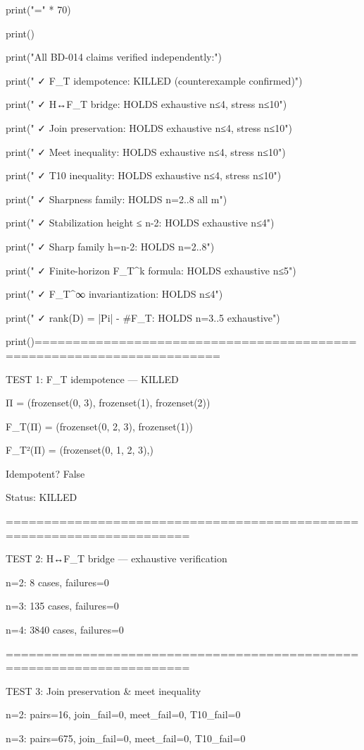 print("=" * 70)

print()

print("All BD-014 claims verified independently:")

print("  ✓ F_T idempotence: KILLED (counterexample confirmed)")

print("  ✓ H↔F_T bridge: HOLDS exhaustive n≤4, stress n≤10")

print("  ✓ Join preservation: HOLDS exhaustive n≤4, stress n≤10")

print("  ✓ Meet inequality: HOLDS exhaustive n≤4, stress n≤10")

print("  ✓ T10 inequality: HOLDS exhaustive n≤4, stress n≤10")

print("  ✓ Sharpness family: HOLDS n=2..8 all m")

print("  ✓ Stabilization height ≤ n-2: HOLDS exhaustive n≤4")

print("  ✓ Sharp family h=n-2: HOLDS n=2..8")

print("  ✓ Finite-horizon F_T^k formula: HOLDS exhaustive n≤5")

print("  ✓ F_T^∞ invariantization: HOLDS n≤4")

print("  ✓ rank(D) = |Pi| - #F_T: HOLDS n=3..5 exhaustive")

print()======================================================================

TEST 1: F_T idempotence — KILLED


Π     = (frozenset({0, 3}), frozenset({1}), frozenset({2}))

F_T(Π)   = (frozenset({0, 2, 3}), frozenset({1}))

F_T²(Π)  = (frozenset({0, 1, 2, 3}),)

Idempotent? False

Status: KILLED


======================================================================

TEST 2: H↔F_T bridge — exhaustive verification


n=2: 8 cases, failures=0

n=3: 135 cases, failures=0

n=4: 3840 cases, failures=0


======================================================================

TEST 3: Join preservation & meet inequality


n=2: pairs=16, join_fail=0, meet_fail=0, T10_fail=0

n=3: pairs=675, join_fail=0, meet_fail=0, T10_fail=0

